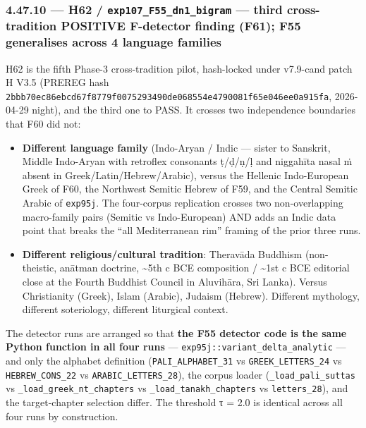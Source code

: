 \documentclass[
]{article}
\providecommand{\tightlist}{%
  \setlength{\itemsep}{0pt}\setlength{\parskip}{0pt}}
\begin{document}
\subsubsection{\texorpdfstring{4.47.10 --- H62 /
\texttt{exp107\_F55\_dn1\_bigram} --- third cross-tradition POSITIVE
F-detector finding (F61); F55 generalises across 4 language
families}{4.47.10 --- H62 / exp107\_F55\_dn1\_bigram --- third cross-tradition POSITIVE F-detector finding (F61); F55 generalises across 4 language families}}\label{h62-exp107_f55_dn1_bigram-third-cross-tradition-positive-f-detector-finding-f61-f55-generalises-across-4-language-families}

H62 is the fifth Phase-3 cross-tradition pilot, hash-locked under
v7.9-cand patch H V3.5 (PREREG hash
\texttt{2bbb70ec86ebcd67f8779f0075293490de068554e4790081f65e046ee0a915fa},
2026-04-29 night), and the third one to PASS. It crosses two
independence boundaries that F60 did not:

\begin{itemize}
\tightlist
\item
  \textbf{Different language family} (Indo-Aryan / Indic --- sister to
  Sanskrit, Middle Indo-Aryan with retroflex consonants ṭ/ḍ/ṇ/ḷ and
  niggahīta nasal ṁ absent in Greek/Latin/Hebrew/Arabic), versus the
  Hellenic Indo-European Greek of F60, the Northwest Semitic Hebrew of
  F59, and the Central Semitic Arabic of \texttt{exp95j}. The
  four-corpus replication crosses two non-overlapping macro-family pairs
  (Semitic vs Indo-European) AND adds an Indic data point that breaks
  the ``all Mediterranean rim'' framing of the prior three runs.
\item
  \textbf{Different religious/cultural tradition}: Theravāda Buddhism
  (non-theistic, anātman doctrine, \textasciitilde5th c BCE composition
  / \textasciitilde1st c BCE editorial close at the Fourth Buddhist
  Council in Aluvihāra, Sri Lanka). Versus Christianity (Greek), Islam
  (Arabic), Judaism (Hebrew). Different mythology, different
  soteriology, different liturgical context.
\end{itemize}

The detector runs are arranged so that \textbf{the F55 detector code is
the same Python function in all four runs} ---
\texttt{exp95j::variant\_delta\_analytic} --- and only the alphabet
definition (\texttt{PALI\_ALPHABET\_31} vs \texttt{GREEK\_LETTERS\_24}
vs \texttt{HEBREW\_CONS\_22} vs \texttt{ARABIC\_LETTERS\_28}), the
corpus loader (\texttt{\_load\_pali\_suttas} vs
\texttt{\_load\_greek\_nt\_chapters} vs
\texttt{\_load\_tanakh\_chapters} vs \texttt{letters\_28}), and the
target-chapter selection differ. The threshold τ = 2.0 is identical
across all four runs by construction.
\end{document}
